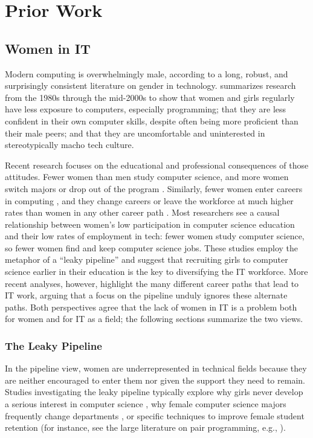\section{Prior Work}\label{lit-review}
\subsection{Women in IT}\label{lit-review-gender}
Modern computing is overwhelmingly male, according to a long, robust, and surprisingly consistent literature on gender in technology. \citet{Sanders2005Gender} summarizes research from the 1980s through the mid-2000s to show that women and girls regularly have less exposure to computers, especially programming; that they are less confident in their own computer skills, despite often being more proficient than their male peers; and that they are uncomfortable and uninterested in stereotypically macho tech culture.

Recent research focuses on the educational and professional consequences of those attitudes. Fewer women than men study computer science, and more women switch majors or drop out of the program \citep{Cohoon2006Just}. Similarly, fewer women enter careers in computing \citep{BartolAspray2006Transition}, and they change careers or leave the workforce at much higher rates than women in any other career path \citep{GlassEtAl2013Whats}. Most researchers see a causal relationship between women's low participation in computer science education and their low rates of employment in tech: fewer women study computer science, so fewer women find and keep computer science jobs. These studies employ the metaphor of a ``leaky pipeline'' \citep{Camp1997Incredible} and suggest that recruiting girls to computer science earlier in their education is the key to diversifying the IT workforce. More recent analyses, however, highlight the many different career paths that lead to IT work, arguing that a focus on the pipeline unduly ignores these alternate paths. Both perspectives agree that the lack of women in IT is a problem both for women and for IT as a field; the following sections summarize the two views.

\subsubsection{The Leaky Pipeline}
In the pipeline view, women are underrepresented in technical fields because they are neither encouraged to enter them nor given the support they need to remain. Studies investigating the leaky pipeline typically explore why girls never develop a serious interest in computer science \citep{BarkerEtAl2006Recruiting}, why female computer science majors frequently change departments \citep{KatzEtAl2006Traversing}, or specific techniques to improve female student retention (for instance, see the large literature on pair programming, e.g., \citealp{WernerEtAl2005Want, PorterEtAl2013Success}).

